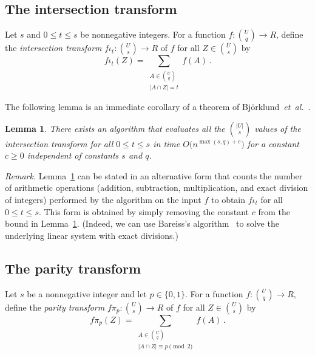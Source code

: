 \documentclass{amsart}
\newtheorem{Lem}{Lemma}
\begin{document}
\subsection{The intersection transform}

Let $s$ and $0\leq t\leq s$ be nonnegative integers.
For a function $f:\binom{U}{q}\rightarrow R$, define 
the {\em intersection transform} $f\iota_t:\binom{U}{s}\rightarrow R$ of $f$
for all $Z\in\binom{U}{s}$ by
\begin{equation}
\label{eq:ft}
f\iota_t(Z)=\!\sum_{\substack{A\in\binom{U}{q}\\|A\cap Z|=t}}\!f(A)\,.
\end{equation}

The following lemma is an immediate corollary of a theorem of Bj\"orklund~{\em et~al.}~\cite[Theorem 1]{BHKK08}.

\begin{Lem}
\label{lem:fit}
There exists an algorithm that evaluates all the ${|U| \choose s}$ values of the intersection transform
for all $0\leq t\leq s$ in time $O\bigl(n^{\max(s,q)+c}\bigr)$ for a 
constant $c\geq 0$ independent of constants $s$ and $q$. 
\end{Lem}

\noindent
{\em Remark.} 
Lemma~\ref{lem:fit} can be stated in an alternative form that counts 
the number of arithmetic operations 
(addition, subtraction, multiplication, and exact division of integers) 
performed by the algorithm on the input $f$ to obtain $f\iota_t$ for all 
$0\leq t\leq s$. This form is obtained by simply removing the constant 
$c$ from the bound in Lemma~\ref{lem:fit}.
(Indeed, we can use Bareiss's algorithm~\cite{B68} to solve the 
underlying linear system with exact divisions.)


\subsection{The parity transform}
\label{sect:parity-trans}

Let $s$ be a nonnegative integer and let $p\in\{0,1\}$. 
For a function $f:\binom{U}{q}\rightarrow R$, define 
the {\em parity transform} $f\pi_p:\binom{U}{s}\rightarrow R$ of $f$
for all $Z\in\binom{U}{s}$ by
\begin{equation}
\label{eq:fp}
f\pi_p(Z)=
\!\!\!\!\!\!\!\!\!\sum_{\substack{A\in\binom{U}{q}\\|A\cap Z|\equiv p\!\!\!\pmod 2}}\!\!\!\!\!\!\!\!\!
f(A)\,.
\end{equation}
\end{document}

